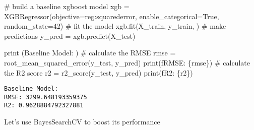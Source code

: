 \documentclass[
  letterpaper,
  DIV=11,
  numbers=noendperiod]{scrreprt}
\newenvironment{Shaded}{\begin{snugshade}}{\end{snugshade}}
\newcommand{\BuiltInTok}[1]{\textcolor[rgb]{0.00,0.23,0.31}{#1}}
\newcommand{\CommentTok}[1]{\textcolor[rgb]{0.37,0.37,0.37}{#1}}
\newcommand{\DecValTok}[1]{\textcolor[rgb]{0.68,0.00,0.00}{#1}}
\newcommand{\NormalTok}[1]{\textcolor[rgb]{0.00,0.23,0.31}{#1}}
\newcommand{\OperatorTok}[1]{\textcolor[rgb]{0.37,0.37,0.37}{#1}}
\newcommand{\SpecialCharTok}[1]{\textcolor[rgb]{0.37,0.37,0.37}{#1}}
\newcommand{\SpecialStringTok}[1]{\textcolor[rgb]{0.13,0.47,0.30}{#1}}
\newcommand{\StringTok}[1]{\textcolor[rgb]{0.13,0.47,0.30}{#1}}
\newcommand{\VariableTok}[1]{\textcolor[rgb]{0.07,0.07,0.07}{#1}}
\begin{document}
\begin{Shaded}
\begin{Highlighting}[]
\CommentTok{\# build a baseline xgboost model}
\NormalTok{xgb }\OperatorTok{=}\NormalTok{ XGBRegressor(objective}\OperatorTok{=}\StringTok{\textquotesingle{}reg:squarederror\textquotesingle{}}\NormalTok{, enable\_categorical}\OperatorTok{=}\VariableTok{True}\NormalTok{, random\_state}\OperatorTok{=}\DecValTok{42}\NormalTok{)}
\CommentTok{\# fit the model}
\NormalTok{xgb.fit(X\_train, y\_train, )}
\CommentTok{\# make predictions}
\NormalTok{y\_pred }\OperatorTok{=}\NormalTok{ xgb.predict(X\_test)}

\BuiltInTok{print}\NormalTok{ (}\StringTok{\textquotesingle{}Baseline Model: \textquotesingle{}}\NormalTok{)}
\CommentTok{\# calculate the RMSE}
\NormalTok{rmse }\OperatorTok{=}\NormalTok{ root\_mean\_squared\_error(y\_test, y\_pred)}
\BuiltInTok{print}\NormalTok{(}\SpecialStringTok{f\textquotesingle{}RMSE: }\SpecialCharTok{\{}\NormalTok{rmse}\SpecialCharTok{\}}\SpecialStringTok{\textquotesingle{}}\NormalTok{)}
\CommentTok{\# calculate the R2 score}
\NormalTok{r2 }\OperatorTok{=}\NormalTok{ r2\_score(y\_test, y\_pred)}
\BuiltInTok{print}\NormalTok{(}\SpecialStringTok{f\textquotesingle{}R2: }\SpecialCharTok{\{}\NormalTok{r2}\SpecialCharTok{\}}\SpecialStringTok{\textquotesingle{}}\NormalTok{)}
\end{Highlighting}
\end{Shaded}

\begin{verbatim}
Baseline Model: 
RMSE: 3299.648193359375
R2: 0.9628884792327881
\end{verbatim}

Let's use BayesSearchCV to boost its performance
\end{document}
